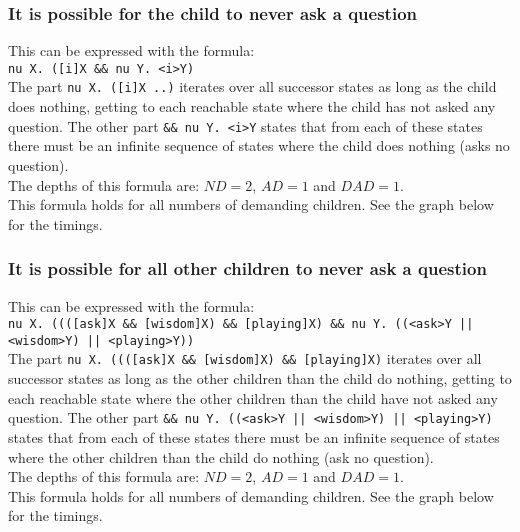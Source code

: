 \documentclass[10pt,a4paper]{article}
\begin{document}
\subsubsection{It is possible for the child to never ask a question}
This can be expressed with the formula:\\
{\tt nu X. ([i]X \&\& nu Y. <i>Y)}\\
The part {\tt nu X. ([i]X ..)} iterates over all successor states as long as the child does nothing, getting to each reachable state where the child has not asked any question. The other part {\tt \&\& nu Y. <i>Y} states that from each of these states there must be an infinite sequence of states where the child does nothing (asks no question).\\
The depths of this formula are: $ND = 2$, $AD = 1$ and $DAD = 1$.\\
This formula holds for all numbers of demanding children. See the graph below for the timings.\\


\subsubsection{It is possible for all other children to never ask a question}
This can be expressed with the formula:\\
{\tt nu X. ((([ask]X \&\& [wisdom]X) \&\& [playing]X) \&\& nu Y. ((<ask>Y || <wisdom>Y) || <playing>Y))}\\
The part {\tt nu X. ((([ask]X \&\& [wisdom]X) \&\& [playing]X)} iterates over all successor states as long as the other children than the child do nothing, getting to each reachable state where the other children than the child have not asked any question. The other part {\tt \&\& nu Y. ((<ask>Y || <wisdom>Y) || <playing>Y)} states that from each of these states there must be an infinite sequence of states where the other children than the child do nothing (ask no question).\\ 
The depths of this formula are: $ND = 2$, $AD = 1$ and $DAD = 1$.\\
This formula holds for all numbers of demanding children. See the graph below for the timings.\\
\end{document}
